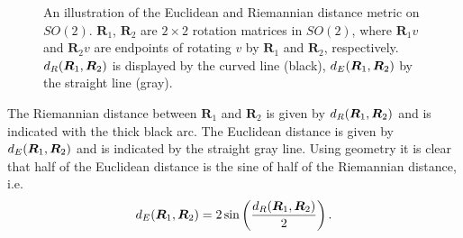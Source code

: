 \begin{figure}[h!]
\begin{center}
\end{center}
\caption{An illustration of the Euclidean and Riemannian distance metric on $SO(2)$. $\bm R_1$, $\bm R_2$ are $2\times2$ rotation matrices in $SO(2)$, where $\bm R_1v$ and $\bm R_2v$ are endpoints of rotating $v$ by  $\bm R_1$ and $\bm R_2$, respectively.  ${d_R} (\bm R_1,\bm R_2)$ is displayed by the curved line (black), ${d_E} (\bm R_1,\bm R_2)$ by the straight line (gray).}
\label{fig:dEvsdG2} 
\end{figure}

The Riemannian distance between $\bm R_1$ and $\bm R_2$ is given by ${d_R}(\bm R_1,\bm R_2)$ and is indicated with the thick black arc.  The Euclidean distance is given by ${d_E}(\bm R_1,\bm R_2)$ and is indicated by the straight gray line.  Using geometry it is clear that half of the Euclidean distance is the sine of half of the Riemannian distance, i.e.
\[
{d_E}(\bm R_1,\bm R_2)=2\sin\left(\frac{{d_R}(\bm R_1,\bm R_2)}{2}\right).
\]

